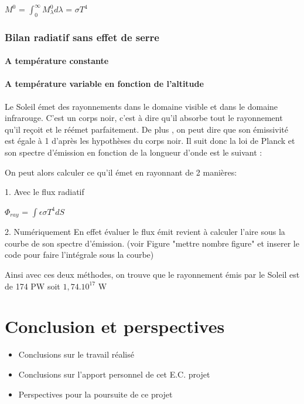 \documentclass[a4paper, 12pt]{report} %
\begin{document}
\hfil $M^{0}$ = $\int_{0}^{\infty} M^{0}_\lambda d\lambda$ = $\sigma T^{4}$ 

\par

\subsection{Bilan radiatif sans effet de serre} 

\subsubsection{A température constante}

\subsubsection{A température variable en fonction de l'altitude}

Le Soleil émet des rayonnements dans le domaine visible et 
dans le domaine infrarouge. C'est un corps noir, c'est à dire
qu'il absorbe tout le rayonnement qu'il reçoit et le réémet 
parfaitement. De plus , on peut dire que son émissivité est 
égale à 1 d'après les hypothèses du corps noir. Il suit donc
la loi de Planck et son spectre d'émission en fonction de 
la longueur d'onde est le suivant :


On peut alors calculer ce qu'il émet en rayonnant de 2 manières: \vspace{\baselineskip}

1. Avec le flux radiatif
\begin{center}
$\Phi_{ray}$ = $\int \epsilon \sigma T^{4} dS$    
\end{center}

2. Numériquement
	En effet évaluer le flux émit revient à calculer l'aire sous la courbe 
de son spectre d'émission. (voir Figure  "mettre nombre figure" et inserer 
le code pour faire l'intégrale sous la courbe) \vspace{\baselineskip}

	Ainsi avec ces deux méthodes, on trouve que le rayonnement émis par le Soleil 
est de 174 PW  soit $1,74.10^{17}$ W

\chapter*{Conclusion et perspectives}
\begin{itemize}
\item Conclusions sur le travail réalisé
\item Conclusions sur l'apport personnel de cet E.C. projet
\item Perspectives pour la poursuite de ce projet
\end{itemize}
\end{document}
